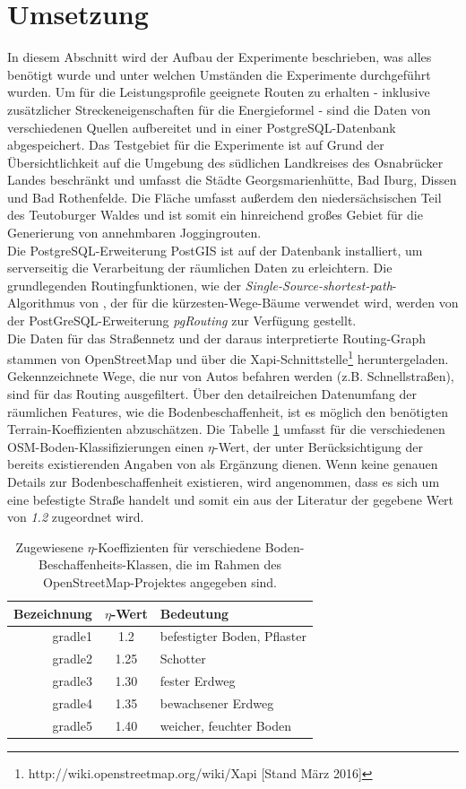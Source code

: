 \documentclass[12pt]{article}
\begin{document}
\section{Umsetzung}\label{experiment}
In diesem Abschnitt wird der Aufbau der Experimente beschrieben, was alles benötigt wurde und unter welchen Umständen die Experimente durchgeführt wurden. Um für die Leistungsprofile geeignete Routen zu erhalten - inklusive zusätzlicher Streckeneigenschaften für die Energieformel - sind die Daten von verschiedenen Quellen aufbereitet und in einer PostgreSQL-Datenbank abgespeichert. Das Testgebiet für die Experimente ist auf Grund der Übersichtlichkeit auf die Umgebung des südlichen Landkreises des Osnabrücker Landes beschränkt und umfasst die Städte Georgsmarienhütte, Bad Iburg, Dissen und Bad Rothenfelde. Die Fläche umfasst außerdem den niedersächsischen Teil des Teutoburger Waldes und ist somit ein hinreichend großes Gebiet für die Generierung von annehmbaren Joggingrouten. \\ 
Die PostgreSQL-Erweiterung PostGIS ist auf der Datenbank installiert, um serverseitig die Verarbeitung der räumlichen Daten zu erleichtern. Die grundlegenden Routingfunktionen, wie der \textit{Single-Source-shortest-path}-Algorithmus von \cite{dijkstra1959}, der für die kürzesten-Wege-Bäume verwendet wird, werden von der PostGreSQL-Erweiterung \textit{pgRouting} zur Verfügung gestellt.\\
Die Daten für das Straßennetz und der daraus interpretierte Routing-Graph stammen von OpenStreetMap und über die Xapi-Schnittstelle\footnote{http://wiki.openstreetmap.org/wiki/Xapi [Stand März 2016]} heruntergeladen. Gekennzeichnete Wege, die nur von Autos befahren werden (z.B. Schnellstraßen), sind für das Routing ausgefiltert. Über den detailreichen Datenumfang der räumlichen Features, wie die Bodenbeschaffenheit, ist es möglich den benötigten Terrain-Koeffizienten abzuschätzen. Die Tabelle \ref{tab:terry_kof} umfasst für die verschiedenen OSM-Boden-Klassifizierungen einen $\eta$-Wert, der unter Berücksichtigung der bereits existierenden Angaben von \citep{givoni1971} als Ergänzung dienen. Wenn keine genauen Details zur Bodenbeschaffenheit existieren, wird angenommen, dass es sich um eine befestigte Straße handelt und somit ein aus der Literatur der gegebene Wert von \textit{1.2} zugeordnet wird.
\begin{table}
\begin{tabular}{r|c|l}
Bezeichnung&$\eta$-Wert&Bedeutung \\ \hline
gradle1&1.2&befestigter Boden, Pflaster \\
gradle2&1.25&Schotter \\
gradle3&1.30&fester Erdweg \\
gradle4&1.35&bewachsener Erdweg \\
gradle5&1.40&weicher, feuchter Boden \\
\end{tabular}
\caption{Zugewiesene $\eta$-Koeffizienten für verschiedene Boden-Beschaffenheits-Klassen, die im Rahmen des OpenStreetMap-Projektes angegeben sind.}
\label{tab:terry_kof}
\end{table}
\end{document}
